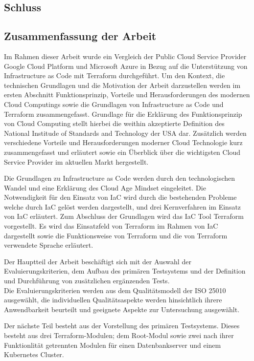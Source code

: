 \begin{spacing}{1.2}

\chapter{Schluss}
\label{sec:schluss}

\section{Zusammenfassung der Arbeit}

Im Rahmen dieser Arbeit wurde ein Vergleich der Public Cloud Service
Provider Google Cloud Platform und Microsoft Azure in Bezug auf die
Unterstützung von Infrastructure as Code mit Terraform durchgeführt.
Um den Kontext, die technischen Grundlagen und die Motivation der Arbeit
darzustellen werden im ersten Abschnitt Funktionsprinzip, Vorteile und
Herausforderungen des modernen Cloud Computings sowie die Grundlagen
von Infrastructure as Code und Terraform zusammengefasst.
Grundlage für die Erklärung des Funktionsprinzip von Cloud Computing
stellt hierbei die weithin akzeptierte Definition des National
Institude of Standards and Technology der USA dar.
Zusätzlich werden verschiedene Vorteile und Herausforderungen moderner
Cloud Technologie kurz zusammengefasst und erläutert sowie ein
Überblick über die wichtigsten Cloud Service Provider im aktuellen
Markt hergestellt.

Die Grundlagen zu Infrastructure as Code werden durch den
technologischen Wandel und eine Erklärung des Cloud Age Mindset
eingeleitet. Die Notwendigkeit für den Einsatz von IaC wird durch
die bestehenden Probleme welche durch IaC gelöst werden dargestellt,
und drei Kernverfahren im Einsatz von IaC erläutert.
Zum Abschluss der Grundlagen wird das IaC Tool Terraform vorgestellt.
Es wird das Einsatzfeld von Terraform im Rahmen von IaC dargestellt
sowie die Funktionsweise von Terraform und die von Terraform
verwendete Sprache erläutert.

Der Hauptteil der Arbeit beschäftigt sich mit der Auswahl der 
Evaluierungskriterien, dem Aufbau des primären Testsystems und
der Definition und Durchführung von zusätzlichen ergänzenden Tests.\\
Die Evaluierungskriterien werden aus dem Qualitätsmodell der ISO
25010 ausgewählt, die individuellen Qualitätsaspekte werden hinsichtlich
ihrere Anwendbarkeit beurteilt und geeignete Aspekte zur Untersuchung
ausgewählt.

Der nächste Teil besteht aus der Vorstellung des primären Testsystems.
Dieses besteht aus drei Terraform-Modulen; dem Root-Modul sowie
zwei nach ihrer Funktionlität getrennten Modulen für einen 
Datenbankserver und einem Kubernetes Cluster.


\end{spacing}
